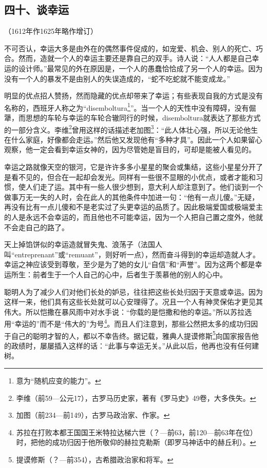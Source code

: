 \subsection*{四十、谈幸运}
\begin{center}
    （1612年作1625年略作增订）
\end{center}
\par 不可否认，幸运大多是由外在的偶然事件促成的，如宠爱、机会、别人的死亡、巧合。然而，造就一个人的幸运主要还是靠自己的双手。诗人说：“人人都是自己幸运的设计师。”最常见的外在原因是，一个人的愚蠢恰恰成了另一个人的幸运。因为没有一个人的暴发不是由别人的失误造成的，“蛇不吃蛇就不能变成龙。”
\par 明显的优点招人赞扬，然而隐藏的优点却带来了幸运；有些表现自我的方式是没有名称的，西班牙人称之为“disemboltura\footnote{意为“随机应变的能力”。}”。当一个人的天性中没有障碍，没有倔犟，而思想的车轮与幸运的车轮合辙同行的时候，disemboltura就表达了那些方式的一部分含义。李维\footnote{李维（前59—公元17），古罗马历史家，著有《罗马史》49卷，大多佚失。}曾用这样的话描述老加图\footnote{加图（前234—前149），古罗马政治家、作家。}：“此人体壮心强，所以无论他生在什么家庭，好像都会走运。”然后他又发现他有“多种才具”。因此一个人如果留心观察，他一定会看到幸运女神的，因为尽管她是盲目的，可却是能被人看见的。
\par 幸运之路就像天空的银河，它是许许多多小星星的聚会或集结，这些小星星分开了是看不见的，但合在一起却会发光。同样有一些很不显眼的小优点，或者才能和习惯，使人们走了运。其中有一些人很少想到，意大利人却注意到了。他们谈到一个做事万无一失的人时，会在此人的其他条件中加进一句：“他有一点儿傻。”无疑，再没有比有一点儿傻和不是老实过了头更幸运的品质了。因此极端爱国或极端爱主的人是永远不会幸运的，而且他也不可能幸运，因为一个人把自己置之度外，他就不会走自己的路了。
\par 天上掉馅饼似的幸运造就冒失鬼、浪荡子（法国人叫“entreprenant”或“remuant”，则好听一点），然而奋斗得到的幸运却造就人才。幸运之神应该受到尊敬，至少是为了她的女儿“自信”和“声誉”。因为这两个都是幸运所生：前者生于一个人自己的心中，后者生于羡慕他的别人的心中。
\par 聪明人为了减少人们对他们长处的妒忌，往往把这些长处归因于天意或幸运。因为这样一来，他们具有这些长处就可以心安理得了。况且一个人有神灵保佑才更见其伟大。所以恺撒在暴风雨中对水手说：“你载的是恺撒和他的幸运。”所以苏拉选用“幸运的”而不是“伟大的”为号\footnote{苏拉在打败本都王国国王米特拉达梯六世（？—前63，前120—前63年在位）时，把他的成功归因于他所敬仰的赫拉克勒斯（即罗马神话中的赫丘利）。}。而且人们注意到，那些公然把太多的成功归因于自己的聪明才智的人，都以不幸告终。据记载，雅典人提谟修斯\footnote{提谟修斯（？—前354），古希腊政治家和将军。}向国家报告他的政绩时，屡屡插入这样的话：“此事与幸运无关。”从此以后，他再也没有任何建树。
